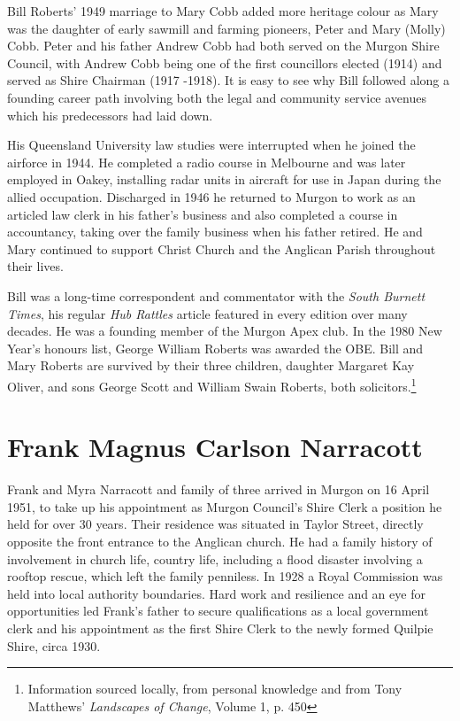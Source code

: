 Bill Roberts' 1949 marriage to Mary Cobb added more heritage colour as Mary was the daughter of early sawmill and farming pioneers, Peter and Mary (Molly) Cobb. Peter and his father Andrew Cobb had both served on the Murgon Shire Council, with Andrew Cobb being one of the first councillors elected (1914) and served as Shire Chairman (1917 -1918). It is easy to see why Bill followed along a founding career path involving both the legal and community service avenues which his predecessors had laid down.



His Queensland University law studies were interrupted when he joined the airforce in 1944. He completed a radio course in Melbourne and was later employed in Oakey, installing radar units in aircraft for use in Japan during the allied occupation. Discharged in 1946 he returned to Murgon to work as an articled law clerk in his father's business and also completed a course in accountancy, taking over the family business when his father retired. He and Mary continued to support Christ Church and the Anglican Parish throughout their lives.



Bill was a long-time correspondent and commentator with the \emph{South Burnett Times}, his regular \emph{Hub Rattles} article featured in every edition over many decades. He was a founding member of the Murgon Apex club. In the 1980 New Year's honours list, George William Roberts was awarded the OBE. Bill and Mary Roberts are survived by their three children, daughter Margaret Kay Oliver, and sons George Scott and William Swain Roberts, both solicitors.\footnote{Information sourced locally, from personal knowledge and from Tony Matthews' \emph{Landscapes of Change}, Volume 1, p. 450}


\section{Frank Magnus Carlson Narracott}



Frank and Myra Narracott and family of three arrived in Murgon on 16 April 1951, to take up his appointment as Murgon Council's Shire Clerk a position he held for over 30 years. Their residence was situated in Taylor Street, directly opposite the front entrance to the Anglican church. He had a family history of involvement in church life, country life, including a flood disaster involving a rooftop rescue, which left the family penniless. In 1928 a Royal Commission was held into local authority boundaries. Hard work and resilience and an eye for opportunities led Frank's father to secure qualifications as a local government clerk and his appointment as the first Shire Clerk to the newly formed Quilpie Shire, circa 1930.



